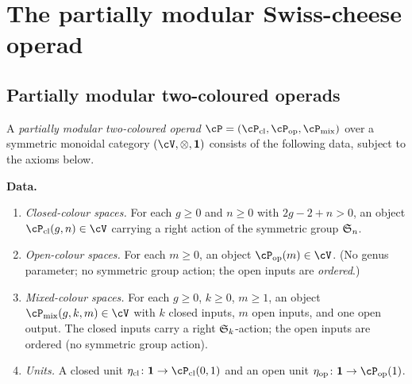 \section{The partially modular Swiss-cheese operad}
\label{sec:partially-modular-sc}

\subsection{Partially modular two-coloured operads}
\label{subsec:partially-modular-def}

\begin{definition}
\label{def:partially-modular}
A \emph{partially modular two-coloured operad}
$\cP = (\cP_{\mathrm{cl}}, \cP_{\mathrm{op}}, \cP_{\mathrm{mix}})$
over a symmetric monoidal category $(\cV, \otimes, \mathbf{1})$
consists of the following data, subject to the axioms below.

\medskip\noindent\textbf{Data.}
\begin{enumerate}[label=\textup{(D\arabic*)}]
\item \emph{Closed-colour spaces.}
 For each $g \ge 0$ and $n \ge 0$ with $2g - 2 + n > 0$,
 an object $\cP_{\mathrm{cl}}(g,n) \in \cV$ carrying a right
 action of the symmetric group $\mathfrak{S}_n$.

\item \emph{Open-colour spaces.}
 For each $m \ge 0$, an object
 $\cP_{\mathrm{op}}(m) \in \cV$.
 (No genus parameter; no symmetric group action;
 the open inputs are \emph{ordered}.)

\item \emph{Mixed-colour spaces.}
 For each $g \ge 0$, $k \ge 0$, $m \ge 1$,
 an object $\cP_{\mathrm{mix}}(g,k,m) \in \cV$
 with $k$ closed inputs, $m$ open inputs, and one open output.
 The closed inputs carry a right $\mathfrak{S}_k$-action;
 the open inputs are ordered (no symmetric group action).

\item \emph{Units.}
 A closed unit $\eta_{\mathrm{cl}} \colon \mathbf{1} \to \cP_{\mathrm{cl}}(0,1)$
 and an open unit $\eta_{\mathrm{op}} \colon \mathbf{1} \to \cP_{\mathrm{op}}(1)$.
\end{enumerate}


\end{definition}
